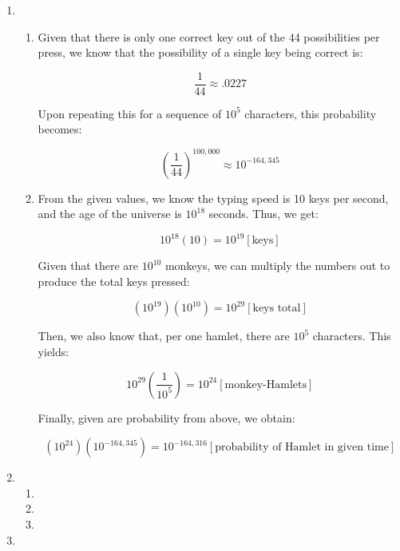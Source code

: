 \begin{enumerate}
  \item

    \begin{enumerate}

      \item 

        Given that there is only one correct key out of the 44 possibilities per press, we know that the possibility of a single key being correct is:

        $$\frac{1}{44}\approx.0227$$

        Upon repeating this for a sequence of $10^5$ characters, this probability becomes:

        $$\left( \frac{1}{44} \right)^{100,000}\approx 10^{-164,345}$$

      \item 

        From the given values, we know the typing speed is 10 keys per second, and the age of the universe is $10^{18}$ seconds. Thus, we get:

        $$10^{18}(10)=10^{19}[\text{keys}]$$

        Given that there are $10^{10}$ monkeys, we can multiply the numbers out to produce the total keys pressed:

        $$\left(10^{19}\right)\left( 10^{10} \right)=10^{29}[\text{keys total}]$$

        Then, we also know that, per one hamlet, there are $10^5$ characters. This yields:

        $$10^{29}\left( \frac{1}{10^5} \right)=10^{24}[\text{monkey-Hamlets}]$$

        Finally, given are probability from above, we obtain:

        $$\left(10^{24}\right)\left( 10^{-164,345} \right)=10^{-164,316}[\text{probability of Hamlet in given time}]$$

    \end{enumerate}
    
  \item

    \begin{enumerate}

      \item

      \item 

      \item 

    \end{enumerate}
    
  \item
    
\end{enumerate}



